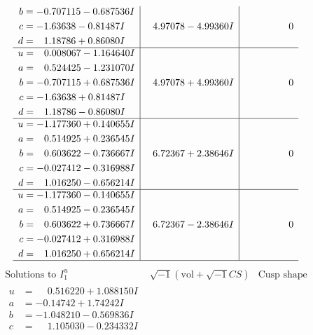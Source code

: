 \documentclass[1p]{elsarticle_modified}
\theoremstyle{definition}
\newcommand{\I}{\sqrt{-1}}
\begin{document}
$$\begin{array}{c|c|c}
\begin{aligned}
b &= -0.707115 - 0.687536 I \\
c &= -1.63638 - 0.81487 I \\
d &= \phantom{-}1.18786 + 0.86080 I\end{aligned}
 & \phantom{-}4.97078 - 4.99360 I & \phantom{-0.000000 } 0 \\ \hline\begin{aligned}
u &= \phantom{-}0.008067 - 1.164640 I \\
a &= \phantom{-}0.524425 - 1.231070 I \\
b &= -0.707115 + 0.687536 I \\
c &= -1.63638 + 0.81487 I \\
d &= \phantom{-}1.18786 - 0.86080 I\end{aligned}
 & \phantom{-}4.97078 + 4.99360 I & \phantom{-0.000000 } 0 \\ \hline\begin{aligned}
u &= -1.177360 + 0.140655 I \\
a &= \phantom{-}0.514925 + 0.236545 I \\
b &= \phantom{-}0.603622 - 0.736667 I \\
c &= -0.027412 - 0.316988 I \\
d &= \phantom{-}1.016250 - 0.656214 I\end{aligned}
 & \phantom{-}6.72367 + 2.38646 I & \phantom{-0.000000 } 0 \\ \hline\begin{aligned}
u &= -1.177360 - 0.140655 I \\
a &= \phantom{-}0.514925 - 0.236545 I \\
b &= \phantom{-}0.603622 + 0.736667 I \\
c &= -0.027412 + 0.316988 I \\
d &= \phantom{-}1.016250 + 0.656214 I\end{aligned}
 & \phantom{-}6.72367 - 2.38646 I & \phantom{-0.000000 } 0\\
 \hline 
 \end{array}$$\newpage$$\begin{array}{c|c|c}  
\text{Solutions to }I^u_{1}& \I (\text{vol} + \sqrt{-1}CS) & \text{Cusp shape}\\
 \hline 
\begin{aligned}
u &= \phantom{-}0.516220 + 1.088150 I \\
a &= -0.14742 + 1.74242 I \\
b &= -1.048210 - 0.569836 I \\
c &= \phantom{-}1.105030 - 0.234332 I \\

\end{aligned}
\end{array}$$
\end{document}
